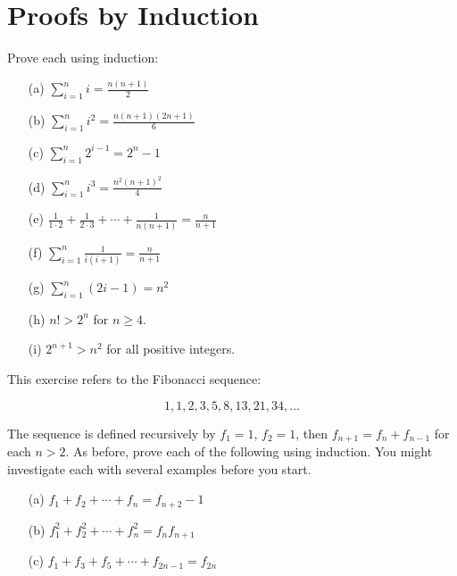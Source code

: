 \documentclass[11pt,paper=b5,footinclude,headinclude]{scrbook} %
\theoremstyle{remark}
\theoremstyle{definition} %
\theoremstyle{theorem} %
\newtheorem{ex}{Exercise\hypertarget{sol:\theex}}[chapter]
\begin{document}
\section{Proofs by Induction}



    \begin{ex} Prove each using induction:
    \begin{enumerate}
        \item[(a)] $\sum_{i=1}^n i = \frac{n(n + 1)}{2}$
        \item[(b)] $\sum_{i=1}^n i^2 = \frac{n(n + 1)(2n + 1)}{6}$
        \item[(c)] $\sum_{i=1}^n 2^{i-1} = 2^n - 1$
        \item[(d)] $\sum_{i=1}^n i^3 = \frac{n^2(n + 1)^2}{4}$
        \item[(e)] $\frac{1}{1 \cdot 2} + \frac{1}{2 \cdot 3} + \cdots + \frac{1}{n(n + 1)} = \frac{n}{n + 1}$
        \item[(f)] $\sum_{i=1}^n \frac{1}{i(i + 1)} = \frac{n}{n + 1}$
        \item[(g)] $\sum_{i=1}^n (2i - 1) = n^2$
        \item[(h)] $n! > 2^n$ for $n \geq 4$.
        \item[(i)] $2^{n+1} > n^2$ for all positive integers.
    \end{enumerate}
    \end{ex} \begin{ex} This exercise refers to the Fibonacci sequence:

\[
1, 1, 2, 3, 5, 8, 13, 21, 34, \ldots
\]

The sequence is defined recursively by $f_1 = 1$, $f_2 = 1$, then $f_{n+1} = f_n + f_{n-1}$ for each $n > 2$. As before, prove each of the following using induction. You might investigate each with several examples before you start.
    \begin{enumerate}
        \item[(a)] $f_1 + f_2 + \cdots + f_n = f_{n+2} - 1$
        \item[(b)] $f_1^2 + f_2^2 + \cdots + f_n^2 = f_n f_{n+1}$
        \item[(c)] $f_1 + f_3 + f_5 + \cdots + f_{2n-1} = f_{2n}$
    \end{enumerate}
    \end{ex}
\end{document}
